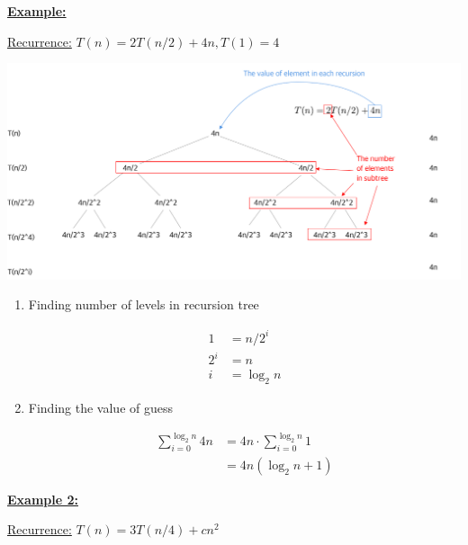 \documentclass[12pt]{article}
\begin{document}
\begin{enumerate}[1.]
\begin{itemize}
        \bigskip

        \underline{\textbf{Example:}}

        \bigskip

        \underline{Recurrence:} $T(n) = 2T(n/2) + 4n, T(1) = 4$

        \bigskip


        \begin{center}
        \includegraphics[width=\linewidth]{images/worksheet_0_solution_2.png}
        \end{center}

        \begin{enumerate}[1.]
            \item Finding number of levels in recursion tree

            \begin{align}
                1 &= n/2^i\\
                2^i &= n\\
                i &= \log_2 n
            \end{align}

            \item Finding the value of guess

            \begin{align}
            \sum\limits_{i=0}^{\log_2 n} 4n &= 4n \cdot \sum\limits_{i=0}^{\log_2 n} 1\\
            &= 4n (\log_2 n + 1)
            \end{align}
        \end{enumerate}

        \bigskip

        \underline{\textbf{Example 2:}}

        \bigskip

        \underline{Recurrence:} $T(n) = 3T(n/4) + cn^2$

        \bigskip


\end{itemize}
\end{enumerate}
\end{document}
